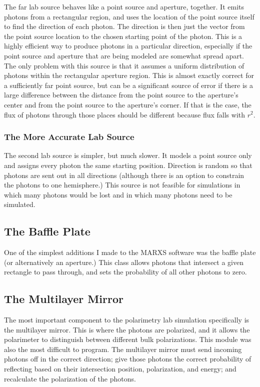 \documentclass[manuscript]{aastex}
\begin{document}
The far lab source behaves like a point source and aperture, together. It emits photons from a rectangular region, and uses the location of the point source itself to find the direction of each photon. The direction is then just the vector from the point source location to the chosen starting point of the photon. This is a highly efficient way to produce photons in a particular direction, especially if the point source and aperture that are being modeled are somewhat spread apart. The only problem with this source is that it assumes a uniform distribution of photons within the rectangular aperture region. This is almost exactly correct for a sufficiently far point source, but can be a significant source of error if there is a large difference between the distance from the point source to the aperture's center and from the point source to the aperture's corner. If that is the case, the flux of photons through those places should be different because flux falls with $r^2$.

\subsubsection{The More Accurate Lab Source}

The second lab source is simpler, but much slower. It models a point source only and assigns every photon the same starting position. Direction is random so that photons are sent out in all directions (although there is an option to constrain the photons to one hemisphere.) This source is not feasible for simulations in which many photons would be lost and in which many photons need to be simulated.

\subsection{The Baffle Plate}

One of the simplest additions I made to the MARXS software was the baffle plate (or alternatively an aperture.) This class allows photons that intersect a given rectangle to pass through, and sets the probability of all other photons to zero.

\subsection{The Multilayer Mirror}

The most important component to the polarimetry lab simulation specifically is the multilayer mirror. This is where the photons are polarized, and it allows the polarimeter to distinguish between different bulk polarizations. This module was also the most difficult to program. The multilayer mirror must send incoming photons off in the correct direction; give those photons the correct probability of reflecting based on their intersection position, polarization, and energy; and recalculate the polarization of the photons.
\end{document}
